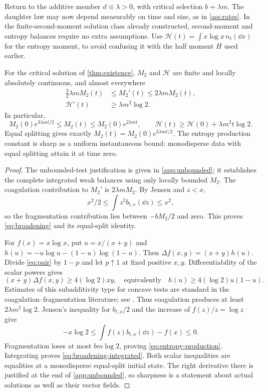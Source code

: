 Return to the additive member $d\equiv\lambda>0$, with critical selection
$b=\lambda m$. The daughter law may now depend measurably on time and size,
as in \cref{ass:rates}. In the finite-second-moment solution class already
constructed, second-moment and entropy balances require no extra assumptions.
Use $\mathcal H(t)=\int x\log x\,n_t(\dd x)$ for the entropy moment, to
avoid confusing it with the half moment $H$ used earlier.

\begin{proposition}\label{prop:broadening-entropy}
For the critical solution of \cref{thm:existence}, $M_2$ and $\mathcal H$
are finite and locally absolutely continuous, and almost everywhere
\begin{align}
 \frac32\lambda mM_2(t)&\leq M_2'(t)\leq2\lambda mM_2(t),
 \label{eq:broadening}\\
 \mathcal H'(t)&\geq\lambda m^2\log2.
 \label{eq:entropy-production}
\end{align}
In particular,
\begin{equation}
 M_2(0)e^{3\lambda mt/2}\leq M_2(t)\leq M_2(0)e^{2\lambda mt},
 \qquad
 \mathcal H(t)\geq\mathcal H(0)+\lambda m^2t\log2.
 \label{eq:broadening-integrated}
\end{equation}
Equal splitting gives exactly $M_2(t)=M_2(0)e^{3\lambda mt/2}$.
The entropy production constant is sharp as a uniform instantaneous bound:
monodisperse data with equal splitting attain it at time zero.
\end{proposition}

\begin{proof}
The unbounded-test justification is given in \cref{app:unbounded}; it
establishes the complete integrated weak balances using only locally
bounded $M_2$. The coagulation contribution to $M_2'$ is
$2\lambda mM_2$. By Jensen and $z<x$,
\[
 x^2/2\leq\int z^2b_{t,x}(\dd z)\leq x^2,
\]
so the fragmentation contribution lies between $-bM_2/2$ and zero.
This proves \eqref{eq:broadening} and its equal-split identity.

For $f(x)=x\log x$, put $u=x/(x+y)$ and
$h(u)=-u\log u-(1-u)\log(1-u)$. Then
$\Delta f(x,y)=(x+y)h(u)$. Divide \eqref{eq:pair} by $1-p$ and let
$p\uparrow1$ at fixed positive $x,y$. Differentiability of the scalar powers
gives
\begin{equation}
 (x+y)\Delta f(x,y)\geq4(\log2)xy,
 \quad\text{equivalently}\quad h(u)\geq4(\log2)u(1-u).
 \label{eq:entropy-pair}
\end{equation}
Estimates of this subadditivity type for concave tests are standard in
the coagulation--fragmentation literature; see
\citet{EscobedoMischlerRodriguezRicard2005}.
Thus coagulation produces at least $2\lambda m^2\log2$. Jensen's inequality
for $b_{t,x}/2$ and the increase of $f(z)/z=\log z$ give
\[
 -x\log2\leq\int f(z)b_{t,x}(\dd z)-f(x)\leq0.
\]
Fragmentation loses at most $bm\log2$, proving
\eqref{eq:entropy-production}. Integrating proves
\eqref{eq:broadening-integrated}. Both scalar inequalities are equalities
at a monodisperse equal-split initial state. The right derivative there
is justified at the end of \cref{app:unbounded}, so sharpness is a statement
about actual solutions as well as their vector fields.
\end{proof}

